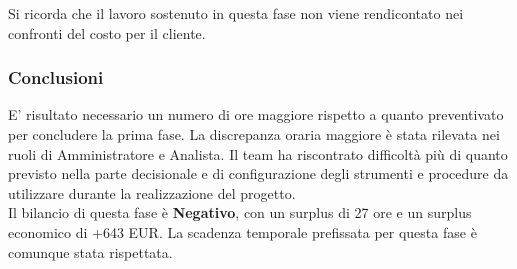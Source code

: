 Si ricorda che il lavoro sostenuto in questa fase non viene rendicontato nei confronti del costo per il cliente.
\subsubsection{Conclusioni}
E' risultato necessario un numero di ore maggiore rispetto a quanto preventivato per concludere la prima fase. La discrepanza oraria maggiore è stata rilevata nei ruoli di Amministratore e Analista. Il team ha riscontrato difficoltà più di quanto previsto nella parte decisionale e di configurazione degli strumenti e procedure da utilizzare durante la realizzazione del progetto.
\\Il bilancio di questa fase è \textbf{Negativo}, con un surplus di 27 ore e un surplus economico di +643 EUR. La scadenza temporale prefissata per questa fase è comunque stata rispettata.